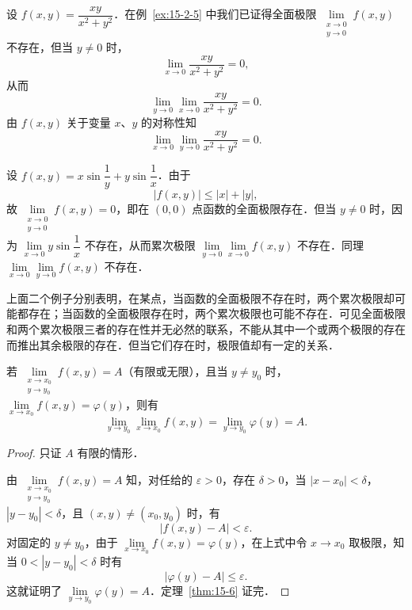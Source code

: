 \begin{example}\label{ex:15-2-7}
设 $f(x,y)=\dfrac{xy}{x^{2}+y^{2}}$．在例~\ref{ex:15-2-5} 中我们已证得全面极限 $\lim\limits_{\substack{x\to0\\y\to0}}f(x,y)$ 不存在，但当 $y\neq0$ 时，
\[
\lim_{x\to0}\dfrac{xy}{x^{2}+y^{2}}=0,
\]
从而
\[
\lim_{y\to0}\lim_{x\to0}\dfrac{xy}{x^{2}+y^{2}}=0.
\]
由 $f(x,y)$ 关于变量 $x$、$y$ 的对称性知
\[
\lim_{x\to0}\lim_{y\to0}\dfrac{xy}{x^{2}+y^{2}}=0.
\]
\end{example}

\begin{example}\label{ex:15-2-8}
设 $f(x,y)=x\sin\dfrac{1}{y}+y\sin\dfrac{1}{x}$．由于
\[
\left|f(x,y)\right|\leqslant\left|x\right|+\left|y\right|,
\]
故 $\lim\limits_{\substack{x\to0\\y\to0}}f(x,y)=0$，即在 $(0,0)$ 点函数的全面极限存在．但当 $y\neq0$ 时，因为 $\lim\limits_{x\to0}y\sin\dfrac{1}{x}$ 不存在，从而累次极限 $\lim\limits_{y\to0}\lim\limits_{x\to0}f(x,y)$ 不存在．同理 $\lim\limits_{x\to0}\lim\limits_{y\to0}f(x,y)$ 不存在．
\end{example}

上面二个例子分别表明，在某点，当函数的全面极限不存在时，两个累次极限却可能都存在；当函数的全面极限存在时，两个累次极限也可能不存在．可见全面极限和两个累次极限三者的存在性并无必然的联系，不能从其中一个或两个极限的存在而推出其余极限的存在．但当它们存在时，极限值却有一定的关系．

\begin{theorem}\label{thm:15-6}
若 $\lim\limits_{\substack{x\to x_{0}\\ y\to y_{0}}}f(x,y)=A$（有限或无限），且当 $y\neq y_{0}$ 时，$\lim\limits_{x\to x_{0}}f(x,y)=\varphi(y)$，则有
\[
\lim_{y\to y_{0}}\lim_{x\to x_{0}}f(x,y)=\lim_{y\to y_{0}}\varphi(y)=A.
\]
\end{theorem}

\begin{proof}
只证 $A$ 有限的情形．

由 $\lim\limits_{\substack{x\to x_{0}\\ y\to y_{0}}}f(x,y)=A$ 知，对任给的 $\varepsilon>0$，存在 $\delta>0$，当 $\left|x-x_{0}\right|<\delta$，$\left|y-y_{0}\right|<\delta$，且 $(x,y)\neq(x_{0},y_{0})$ 时，有
\[
\left|f(x,y)-A\right|<\varepsilon.
\]
对固定的 $y\neq y_{0}$，由于 $\lim\limits_{x\to x_{0}}f(x,y)=\varphi(y)$，在上式中令 $x\to x_{0}$ 取极限，知当 $0<\left|y-y_{0}\right|<\delta$ 时有
\[
\left|\varphi(y)-A\right|\leqslant\varepsilon.
\]
这就证明了 $\lim\limits_{y\to y_{0}}\varphi(y)=A$．定理~\ref{thm:15-6} 证完．
\end{proof}

